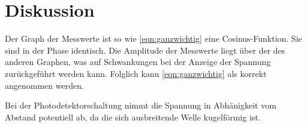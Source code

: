 \section{Diskussion}
\label{sec:Diskussion}

Der Graph der Messwerte ist so wie \ref{eqn:ganzwichtig} eine Cosinus-Funktion. Sie sind in der Phase identisch. Die Amplitude der Messwerte liegt über der des anderen Graphen, was auf Schwankungen bei der Anzeige der Spannung zurückgeführt werden kann.
Folglich kann \ref{eqn:ganzwichtig} als korrekt angenommen werden.

Bei der Photodetektorschaltung nimmt die Spannung in Abhänigkeit vom Abstand potentiell ab, da die sich ausbreitende Welle kugelförmig ist.
